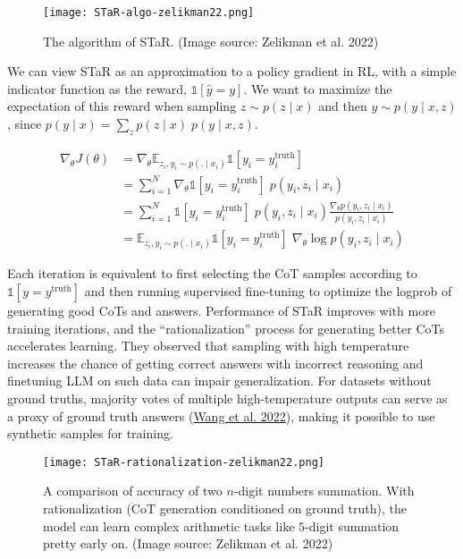 \documentclass[12pt]{article}
\begin{document}
\begin{figure}[h]
    \centering
    \texttt{[image: STaR-algo-zelikman22.png]}
    \caption{The algorithm of STaR. (Image source: Zelikman et al. 2022)}
\end{figure}

We can view STaR as an approximation to a policy gradient in RL, with a simple indicator function as the reward, $\mathbb{1}[\hat{y} = y]$. We want to maximize the expectation of this reward when sampling $z \sim p(z \mid x)$ and then $y \sim p(y \mid x, z)$, since $p(y \mid x) = \sum_z p(z \mid x) \; p(y \mid x, z)$.

\begin{align*}
\nabla_\theta J(\theta)
&= \nabla_\theta \mathbb{E}_{z_i, y_i \sim p(.\mid x_i)} \mathbb{1}[y_i = y_i^\text{truth}] \\
&= \sum_{i=1}^N \nabla_\theta \mathbb{1}[y_i = y_i^\text{truth}] \; p(y_i, z_i \mid x_i) \\
&= \sum_{i=1}^N \mathbb{1}[y_i = y_i^\text{truth}] \; p(y_i, z_i \mid x_i) \frac{\nabla_\theta p(y_i, z_i \mid x_i)}{p(y_i, z_i \mid x_i)} \\
&= \mathbb{E}_{z_i, y_i \sim p(.\mid x_i)} \mathbb{1}[y_i = y_i^\text{truth}] \; \nabla_\theta \log p(y_i, z_i \mid x_i)
\end{align*}

Each iteration is equivalent to first selecting the CoT samples according to $\mathbb{1}[y=y^\text{truth}]$ and then running supervised fine-tuning to optimize the logprob of generating good CoTs and answers. Performance of STaR improves with more training iterations, and the “rationalization” process for generating better CoTs accelerates learning. They observed that sampling with high temperature increases the chance of getting correct answers with incorrect reasoning and finetuning LLM on such data can impair generalization. For datasets without ground truths, majority votes of multiple high-temperature outputs can serve as a proxy of ground truth answers (\href{https://arxiv.org/abs/2207.00747}{Wang et al. 2022}), making it possible to use synthetic samples for training.

\begin{figure}[h]
    \centering
    \texttt{[image: STaR-rationalization-zelikman22.png]}
    \caption{A comparison of accuracy of two $n$-digit numbers summation. With rationalization (CoT generation conditioned on ground truth), the model can learn complex arithmetic tasks like $5$-digit summation pretty early on. (Image source: Zelikman et al. 2022)}
\end{figure}
\end{document}
